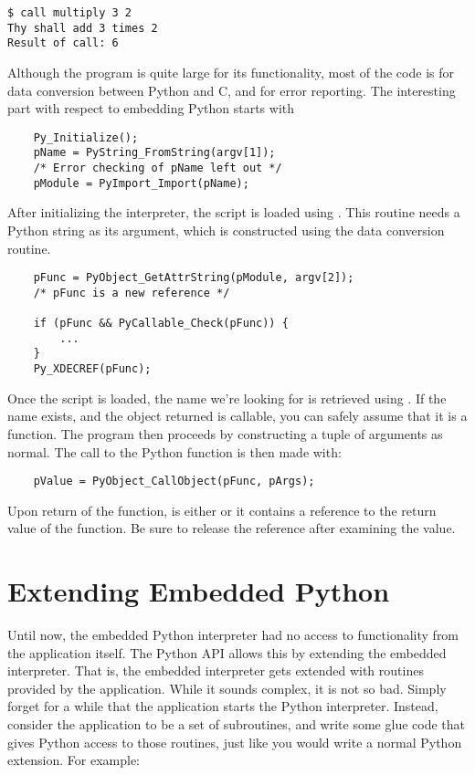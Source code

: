 \begin{verbatim}
$ call multiply 3 2
Thy shall add 3 times 2
Result of call: 6
\end{verbatim} %

Although the program is quite large for its functionality, most of the
code is for data conversion between Python and C, and for error
reporting.  The interesting part with respect to embedding Python
starts with

\begin{verbatim}
    Py_Initialize();
    pName = PyString_FromString(argv[1]);
    /* Error checking of pName left out */
    pModule = PyImport_Import(pName);
\end{verbatim}

After initializing the interpreter, the script is loaded using
.  This routine needs a Python string
as its argument, which is constructed using the
 data conversion routine.

\begin{verbatim}
    pFunc = PyObject_GetAttrString(pModule, argv[2]);
    /* pFunc is a new reference */

    if (pFunc && PyCallable_Check(pFunc)) {
        ...
    }
    Py_XDECREF(pFunc);
\end{verbatim}

Once the script is loaded, the name we're looking for is retrieved
using .  If the name exists, and
the object returned is callable, you can safely assume that it is a
function.  The program then proceeds by constructing a tuple of
arguments as normal.  The call to the Python function is then made
with:

\begin{verbatim}
    pValue = PyObject_CallObject(pFunc, pArgs);
\end{verbatim}

Upon return of the function,  is either \NULL{} or it
contains a reference to the return value of the function.  Be sure to
release the reference after examining the value.


\section{Extending Embedded Python
         \label{extending-with-embedding}}

Until now, the embedded Python interpreter had no access to
functionality from the application itself.  The Python API allows this
by extending the embedded interpreter.  That is, the embedded
interpreter gets extended with routines provided by the application.
While it sounds complex, it is not so bad.  Simply forget for a while
that the application starts the Python interpreter.  Instead, consider
the application to be a set of subroutines, and write some glue code
that gives Python access to those routines, just like you would write
a normal Python extension.  For example:


